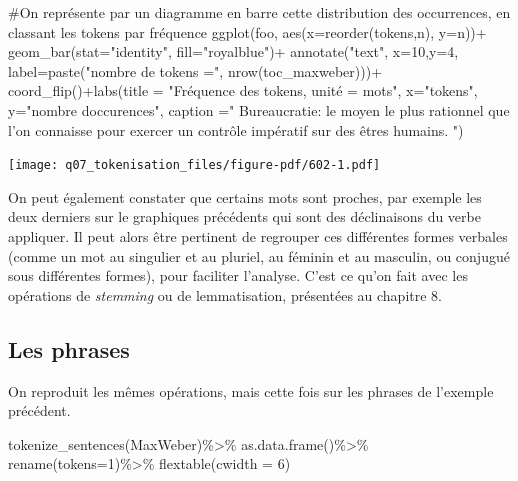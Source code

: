 \documentclass[
  letterpaper,
  DIV=11,
  numbers=noendperiod]{scrreprt}
\newenvironment{Shaded}{\begin{snugshade}}{\end{snugshade}}
\newcommand{\AttributeTok}[1]{\textcolor[rgb]{0.40,0.45,0.13}{#1}}
\newcommand{\CommentTok}[1]{\textcolor[rgb]{0.37,0.37,0.37}{#1}}
\newcommand{\DecValTok}[1]{\textcolor[rgb]{0.68,0.00,0.00}{#1}}
\newcommand{\FunctionTok}[1]{\textcolor[rgb]{0.28,0.35,0.67}{#1}}
\newcommand{\NormalTok}[1]{\textcolor[rgb]{0.00,0.23,0.31}{#1}}
\newcommand{\SpecialCharTok}[1]{\textcolor[rgb]{0.37,0.37,0.37}{#1}}
\newcommand{\StringTok}[1]{\textcolor[rgb]{0.13,0.47,0.30}{#1}}
\begin{document}
\begin{Shaded}
\begin{Highlighting}[]
\CommentTok{\#On représente par un diagramme en barre cette distribution des occurrences, en classant les tokens par fréquence}
\FunctionTok{ggplot}\NormalTok{(foo, }\FunctionTok{aes}\NormalTok{(}\AttributeTok{x=}\FunctionTok{reorder}\NormalTok{(tokens,n), }\AttributeTok{y=}\NormalTok{n))}\SpecialCharTok{+}
               \FunctionTok{geom\_bar}\NormalTok{(}\AttributeTok{stat=}\StringTok{"identity"}\NormalTok{, }\AttributeTok{fill=}\StringTok{"royalblue"}\NormalTok{)}\SpecialCharTok{+}
        \FunctionTok{annotate}\NormalTok{(}\StringTok{"text"}\NormalTok{, }\AttributeTok{x=}\DecValTok{10}\NormalTok{,}\AttributeTok{y=}\DecValTok{4}\NormalTok{, }\AttributeTok{label=}\FunctionTok{paste}\NormalTok{(}\StringTok{"nombre de tokens ="}\NormalTok{, }\FunctionTok{nrow}\NormalTok{(toc\_maxweber)))}\SpecialCharTok{+}
               \FunctionTok{coord\_flip}\NormalTok{()}\SpecialCharTok{+}\FunctionTok{labs}\NormalTok{(}\AttributeTok{title =} \StringTok{"Fréquence des tokens, unité = mots"}\NormalTok{, }\AttributeTok{x=}\StringTok{"tokens"}\NormalTok{, }\AttributeTok{y=}\StringTok{"nombre d\textquotesingle{}occurences"}\NormalTok{, }\AttributeTok{caption =}\StringTok{" \textquotesingle{}Bureaucratie: le moyen le plus rationnel que l’on connaisse pour exercer un contrôle impératif sur des êtres humains.\textquotesingle{} "}\NormalTok{)}
\end{Highlighting}
\end{Shaded}

\texttt{[image: q07\_tokenisation\_files/figure-pdf/602-1.pdf]}

On peut également constater que certains mots sont proches, par exemple
les deux derniers sur le graphiques précédents qui sont des déclinaisons
du verbe appliquer. Il peut alors être pertinent de regrouper ces
différentes formes verbales (comme un mot au singulier et au pluriel, au
féminin et au masculin, ou conjugué sous différentes formes), pour
faciliter l'analyse. C'est ce qu'on fait avec les opérations de
\emph{stemming} ou de lemmatisation, présentées au chapitre 8.

\subsection{Les phrases}\label{les-phrases}

On reproduit les mêmes opérations, mais cette fois sur les phrases de
l'exemple précédent.

\begin{Shaded}
\begin{Highlighting}[]
\FunctionTok{tokenize\_sentences}\NormalTok{(MaxWeber)}\SpecialCharTok{\%\textgreater{}\%}
  \FunctionTok{as.data.frame}\NormalTok{()}\SpecialCharTok{\%\textgreater{}\%}
  \FunctionTok{rename}\NormalTok{(}\AttributeTok{tokens=}\DecValTok{1}\NormalTok{)}\SpecialCharTok{\%\textgreater{}\%}
  \FunctionTok{flextable}\NormalTok{(}\AttributeTok{cwidth =} \DecValTok{6}\NormalTok{)}
\end{Highlighting}
\end{Shaded}
\end{document}
